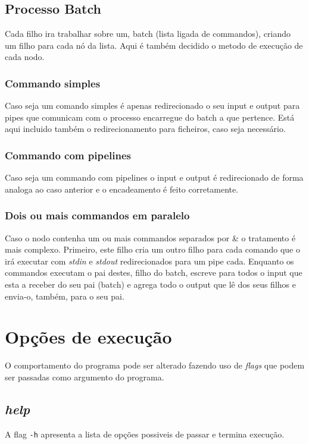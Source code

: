 \documentclass[12pt,a4paper]{report}
\begin{document}
    \section{Processo Batch}
        Cada filho ira trabalhar sobre um, batch (lista ligada de commandos),
        criando um filho para cada nó da lista. Aqui é também decidido o metodo
        de execução de cada nodo.
        \subsection{Commando simples}
            Caso seja um comando simples é apenas redirecionado o seu input e
            output para pipes que comunicam com o processo encarregue do batch a
            que pertence. Está aqui incluido também o redirecionamento para
            ficheiros, caso seja necessário.
        \subsection{Commando com pipelines}
            Caso seja um commando com pipelines o input e output é redirecionado
            de forma analoga ao caso anterior e o encadeamento é feito
            corretamente.
        \subsection{Dois ou mais commandos em paralelo}
            Caso o nodo contenha um ou mais commandos separados por \& o
            tratamento é mais complexo. Primeiro, este filho cria um outro
            filho para cada comando que o irá executar com \textit{stdin}
            e \textit{stdout} redirecionados para um pipe cada. Enquanto os
            commandos executam o pai destes, filho do batch, escreve para todos
            o input que esta a receber do seu pai (batch) e agrega todo o
            output que lê dos seus filhos e envia-o, também, para o seu pai.

\chapter{Opções de execução}
    O comportamento do programa pode ser alterado fazendo uso de \textit{flags}
    que podem ser passadas como argumento do programa.
    \section{\textit{help}}
        A flag \texttt{-h} apresenta a lista de opções possiveis
        de passar e termina execução.
\end{document}
